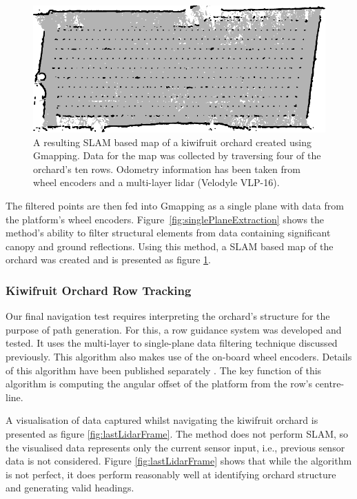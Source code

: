 \documentclass[preprint,authoryear,12pt]{elsarticle}
\begin{document}
        \begin{figure}[htb]
            \centering
            \includegraphics{imgs/gmapmap/gmapmap.pdf}
            \caption{
                A resulting SLAM based map of a kiwifruit orchard created using Gmapping.
                Data for the map was collected by traversing four of the orchard's ten rows.
                Odometry information has been taken from wheel encoders and a multi-layer lidar (Velodyle VLP-16).
            }
            \label{fig:gmapmap}
        \end{figure}

        The filtered points are then fed into Gmapping as a single plane with data from the platform's wheel encoders.
        Figure~\ref{fig:singlePlaneExtraction} shows the method's ability to filter structural elements from data containing significant canopy and ground reflections.
        Using this method, a SLAM based map of the orchard was created and is presented as figure \ref{fig:gmapmap}.


    \subsubsection{Kiwifruit Orchard Row Tracking}
        \label{sect:row_tracking}

        Our final navigation test requires interpreting the orchard's structure for the purpose of path generation.
        For this, a row guidance system was developed and tested.
        It uses the multi-layer to single-plane data filtering technique discussed previously.
        This algorithm also makes use of the on-board wheel encoders.
        Details of this algorithm have been published separately \citep{Bell2016}.
        The key function of this algorithm is computing the angular offset of the platform from the row's centre-line.

        A visualisation of data captured whilst navigating the kiwifruit orchard is presented as figure \ref{fig:lastLidarFrame}.
        The method does not perform SLAM, so the visualised data represents only the current sensor input, i.e., previous sensor data is not considered.
        Figure \ref{fig:lastLidarFrame} shows that while the algorithm is not perfect, it does perform reasonably well at identifying orchard structure and generating valid headings.
\end{document}
